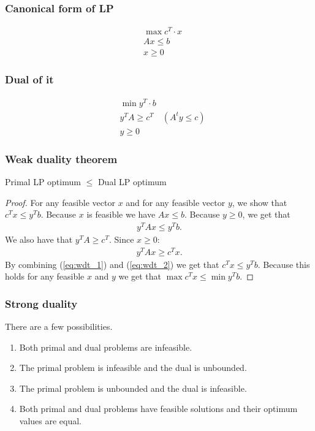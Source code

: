 \subsubsection{Canonical form of LP}
\begin{align*}
    &\max c^T \cdot x\\
    &Ax \leq b\\
    &x \geq 0
\end{align*}
\subsubsection{Dual of it}

\begin{align*}
    &\min y^T \cdot b\\
    &y^TA \geq c^T \quad (A^ty \leq c)\\
    &y \geq 0
\end{align*}

\subsubsection{Weak duality theorem}
\begin{theorem}
Primal LP optimum $\leq$ Dual LP optimum
\end{theorem}
\begin{proof}
    For any feasible vector $x$ and for any feasible vector $y$, we show that $c^Tx
    \leq y^Tb$. Because $x$ is feasible we have $Ax \leq b$. Because $y \geq 0$, we
    get that 
\begin{align}
    \label{eq:wdt_1}
    y^TAx \leq y^Tb.
\end{align}
   We also have that $y^TA \geq c^T$. Since $x \geq 0$:
\begin{align}
    \label{eq:wdt_2}
    y^TAx \geq c^Tx.
\end{align}
By combining (\ref{eq:wdt_1}) and (\ref{eq:wdt_2}) we get that $c^Tx \leq y^Tb$. Because
this holds for any feasible $x$ and $y$ we get that $\max c^Tx \leq \min y^Tb$.

\end{proof}
\subsubsection{Strong duality}
\begin{theorem}
    There are a few possibilities.
    \begin{enumerate}
        \item Both primal and dual problems are infeasible.
        \item The primal problem is infeasible and the dual is unbounded.
        \item The primal problem is unbounded and the dual is infeasible.
        \item Both primal and dual problems have feasible solutions and their optimum
            values are equal.
    \end{enumerate}
\end{theorem}
